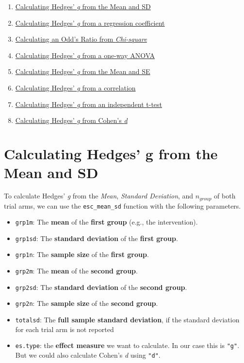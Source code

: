 \documentclass[]{book}
\providecommand{\tightlist}{%
  \setlength{\itemsep}{0pt}\setlength{\parskip}{0pt}}
\theoremstyle{definition}
\theoremstyle{definition}
\theoremstyle{definition}
\theoremstyle{remark}
\begin{document}
\begin{enumerate}
\def\labelenumi{\arabic{enumi}.}
\tightlist
\item
  \protect\hyperlink{a}{Calculating Hedges' \emph{g} from the Mean and
  SD}
\item
  \protect\hyperlink{b}{Calculating Hedges' \emph{g} from a regression
  coefficient}
\item
  \protect\hyperlink{c}{Calculating an Odd's Ratio from
  \emph{Chi-square}}
\item
  \protect\hyperlink{d}{Calculating Hedges' \emph{g} from a one-way
  ANOVA}
\item
  \protect\hyperlink{e}{Calculating Hedges' \emph{g} from the Mean and
  SE}
\item
  \protect\hyperlink{f}{Calculating Hedges' \emph{g} from a correlation}
\item
  \protect\hyperlink{g}{Calculating Hedges' \emph{g} from an independent
  t-test}
\item
  \protect\hyperlink{h}{Calculating Hedges' \emph{g} from Cohen's
  \emph{d}}
\end{enumerate}

\hypertarget{a}{\section{Calculating Hedges' g from the Mean and
SD}\label{a}}

To calculate Hedges' \emph{g} from the \emph{Mean}, \emph{Standard
Deviation}, and \(n_{group}\) of both trial arms, we can use the
\texttt{esc\_mean\_sd} function with the following parameters.

\begin{itemize}
\tightlist
\item
  \texttt{grp1m}: The \textbf{mean} of the \textbf{first group} (e.g.,
  the intervention).
\item
  \texttt{grp1sd}: The \textbf{standard deviation} of the \textbf{first
  group}.
\item
  \texttt{grp1n}: The \textbf{sample size} of the \textbf{first group}.
\item
  \texttt{grp2m}: The \textbf{mean} of the \textbf{second group}.
\item
  \texttt{grp2sd}: The \textbf{standard deviation} of the \textbf{second
  group}.
\item
  \texttt{grp2n}: The \textbf{sample size} of the \textbf{second group}.
\item
  \texttt{totalsd}: The \textbf{full sample standard deviation}, if the
  standard deviation for each trial arm is not reported
\item
  \texttt{es.type}: the \textbf{effect measure} we want to calculate. In
  our case this is \texttt{"g"}. But we could also calculate Cohen's
  \emph{d} using \texttt{"d"}.
\end{itemize}
\end{document}
